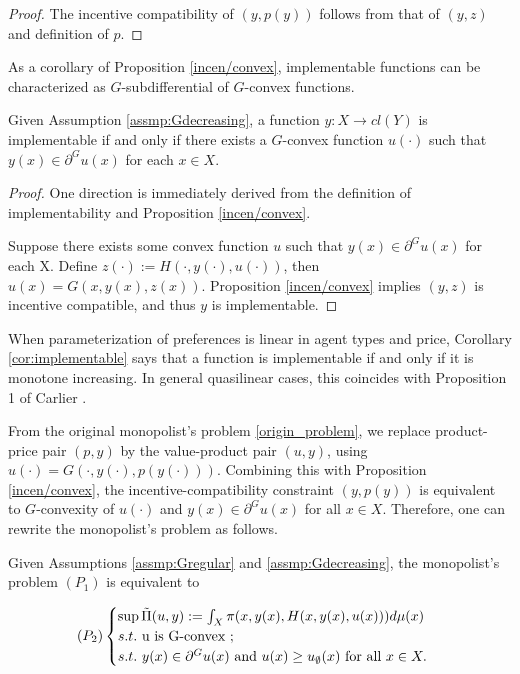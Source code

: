 {\begin{proof}
	The incentive compatibility of $(y, p(y))$ follows from that of $(y, z)$ and definition of $p$.
\end{proof}

As a corollary of Proposition \ref{incen/convex},  implementable functions can be characterized as $G$-subdifferential of $G$-convex functions. 


\begin{corollary}\label{cor:implementable}
	Given Assumption \ref{assmp:Gdecreasing}, a function $y: X \rightarrow cl(Y)$ is implementable if and only if there exists a $G$-convex function $u(\cdot)$ such that $y(x) \in \partial^G u(x)$ for each $x\in X$.
\end{corollary}


\begin{proof}%
	One direction is immediately derived from the definition of implementability and Proposition \ref{incen/convex}.
	
	Suppose there exists some convex function $u$ such that $y(x) \in \partial^G u(x)$ for each X. Define $z(\cdot):= H(\cdot, y(\cdot), u(\cdot))$, then $u(x) = G(x, y(x), z(x))$.
	Proposition \ref{incen/convex} implies $(y, z)$ is incentive compatible, and thus $y$ is implementable.
\end{proof}
}

When parameterization of preferences is linear in agent types and price, Corollary \ref{cor:implementable} says that a function is implementable if and only if it is monotone increasing. In general quasilinear cases, this coincides with Proposition 1 of Carlier \cite{Carlier01}. \medskip


From the original monopolist's problem \eqref{origin_problem}, we replace product-price pair $(p,y)$ by the value-product pair $(u,y)$, using $u(\cdot) = G(\cdot, y(\cdot), p(y(\cdot)))$. %
Combining this with Proposition \ref{incen/convex}, the incentive-compatibility constraint $(y,p(y))$ is equivalent to $G$-convexity of $u(\cdot)$ and $y(x) \in \partial^G u(x)$ for all $x\in X$. Therefore, one can rewrite the monopolist's problem as follows.

\begin{proposition}\label{equiv_form}
	
	Given Assumptions \ref{assmp:Gregular} and \ref{assmp:Gdecreasing}, the monopolist's problem $(P_1)$ is equivalent to
	
	\begin{equation}\label{Principal_new_problem}
	(P_2)
	\begin{cases}
	\sup \tilde{\Pi}(u,y):=\int_{X} \pi(x, y(x), H(x,y(x), u(x))) d\mu(x)\\
	s.t.\ $u$ \text{ is } $G$\text{-convex };\\
	s.t.\ y(x) \in \partial^G u(x) \text{ and }u(x)\ge u_{\emptyset}(x) \text{ for all } x \in X.
	\end{cases}
	\end{equation}
\end{proposition}


